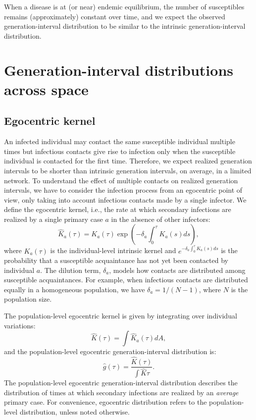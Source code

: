 \documentclass[12pt]{article}
\begin{document}
When a disease is at (or near) endemic equilibrium, the number of susceptibles remains (approximately) constant over time, and we expect the observed generation-interval distribution to be similar to the intrinsic generation-interval distribution.

\section{Generation-interval distributions across space}

\subsection{Egocentric kernel}

An infected individual may contact the same susceptible individual multiple times but  infectious contacts give rise to infection only when the susceptible individual is contacted for the first time.
Therefore, we expect realized generation intervals to be shorter than intrinsic generation intervals, on average, in a limited network.
To understand the effect of multiple contacts on realized generation intervals, we have to consider the infection process from an egocentric point of view, only taking into account infectious contacts made by a single infector.
We define the egocentric kernel, i.e., the rate at which secondary infections are realized by a single primary case $a$ in the absence of other infectors:
\begin{equation}
\hat{K}_a(\tau) = K_a(\tau) \exp \left(- \delta_a \int_0^\tau K_a(s) ds\right),
\end{equation}
where $K_a(\tau)$ is the individual-level intrinsic kernel and $e^{- \delta_a \int_0^\tau K_a(s) ds}$ is the probability that a susceptible acquaintance has not yet been contacted by individual $a$.
The dilution term, $\delta_a$, models how contacts are distributed among susceptible acquaintances.
For example, when infectious contacts are distributed equally in a homogeneous population, we have $\delta_a = 1/(N-1)$, where $N$ is the population size.

The population-level egocentric kernel is given by integrating over individual variations:
\begin{equation}
\hat{K}(\tau) = \int \hat{K}_a(\tau) dA,
\end{equation}
and the population-level egocentric generation-interval distribution is:
\begin{equation}
\hat{g}(\tau) = \frac{\hat{K}(\tau)}{\int \hat{K} \tau}.
\label{eq:conditional}
\end{equation}
The population-level egocentric generation-interval distribution describes the distribution of times at which secondary infections are realized by an \emph{average} primary case.
For convenience, egocentric distribution refers to the population-level distribution, unless noted otherwise.
\end{document}
